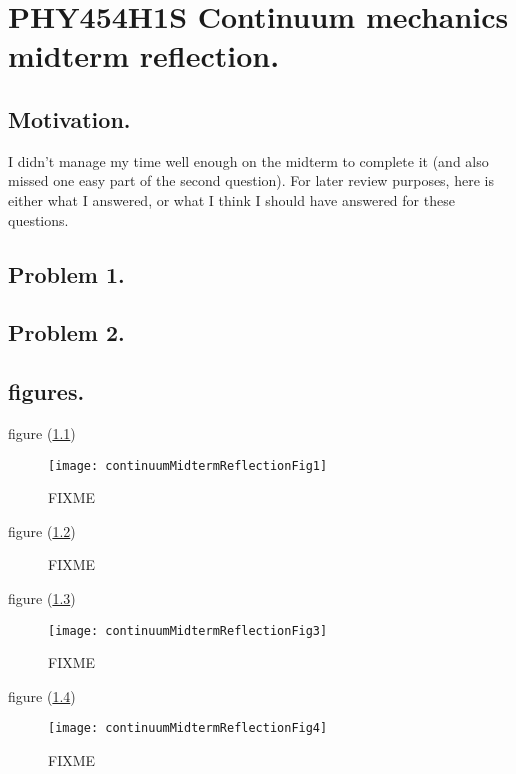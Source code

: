 
%

\chapter{PHY454H1S Continuum mechanics midterm reflection.}
\label{chap:continuumMidtermReflection}
{}
\date{Mar 14, 2012}

\beginArtWithToc

\section{Motivation.}

I didn't manage my time well enough on the midterm to complete it (and also missed one easy part of the second question).  For later review purposes, here is either what I answered, or what I think I should have answered for these questions.

\section{Problem 1.}

\section{Problem 2.}

\section{figures.}

figure (\ref{fig:continuumMidtermReflection:continuumMidtermReflectionFig1})
\begin{figure}[htp]
   \centering
   \texttt{[image: continuumMidtermReflectionFig1]}
   \caption{FIXME}\label{fig:continuumMidtermReflection:continuumMidtermReflectionFig1}
\end{figure}
figure (\ref{fig:continuumMidtermReflection:continuumMidtermReflectionFig2})
\begin{figure}[htp]
   \centering
   \def\svgwidth{0.6\columnwidth}
   
   \caption{FIXME}\label{fig:continuumMidtermReflection:continuumMidtermReflectionFig2}
\end{figure}
figure (\ref{fig:continuumMidtermReflection:continuumMidtermReflectionFig3})
\begin{figure}[htp]
   \centering
   \texttt{[image: continuumMidtermReflectionFig3]}
   \caption{FIXME}\label{fig:continuumMidtermReflection:continuumMidtermReflectionFig3}
\end{figure}
figure (\ref{fig:continuumMidtermReflection:continuumMidtermReflectionFig4})
\begin{figure}[htp]
   \centering
   \texttt{[image: continuumMidtermReflectionFig4]}
   \caption{FIXME}\label{fig:continuumMidtermReflection:continuumMidtermReflectionFig4}
\end{figure}

\EndNoBibArticle
